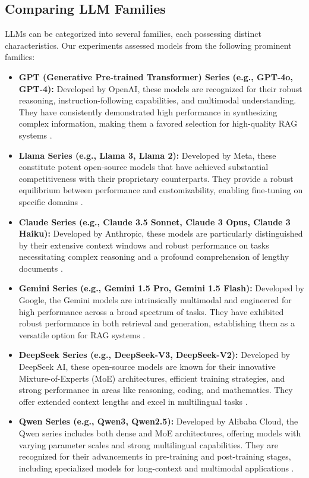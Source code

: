 \subsection{Comparing LLM Families}
LLMs can be categorized into several families, each possessing distinct characteristics. Our experiments assessed models from the following prominent families:
\begin{itemize}
    \item \textbf{GPT (Generative Pre-trained Transformer) Series (e.g., GPT-4o, GPT-4):} Developed by OpenAI, these models are recognized for their robust reasoning, instruction-following capabilities, and multimodal understanding. They have consistently demonstrated high performance in synthesizing complex information, making them a favored selection for high-quality RAG systems \autocite{openai2024gpt4technicalreport}.
    \item \textbf{Llama Series (e.g., Llama 3, Llama 2):} Developed by Meta, these constitute potent open-source models that have achieved substantial competitiveness with their proprietary counterparts. They provide a robust equilibrium between performance and customizability, enabling fine-tuning on specific domains \autocite{touvron2023llama}.
    \item \textbf{Claude Series (e.g., Claude 3.5 Sonnet, Claude 3 Opus, Claude 3 Haiku):} Developed by Anthropic, these models are particularly distinguished by their extensive context windows and robust performance on tasks necessitating complex reasoning and a profound comprehension of lengthy documents \autocite{anthropic2024claude3}.
    \item \textbf{Gemini Series (e.g., Gemini 1.5 Pro, Gemini 1.5 Flash):} Developed by Google, the Gemini models are intrinsically multimodal and engineered for high performance across a broad spectrum of tasks. They have exhibited robust performance in both retrieval and generation, establishing them as a versatile option for RAG systems \autocite{gemini2023}.
    \item \textbf{DeepSeek Series (e.g., DeepSeek-V3, DeepSeek-V2):} Developed by DeepSeek AI, these open-source models are known for their innovative Mixture-of-Experts (MoE) architectures, efficient training strategies, and strong performance in areas like reasoning, coding, and mathematics. They offer extended context lengths and excel in multilingual tasks \autocite{deepseekai2025deepseekv3technicalreport}.
    \item \textbf{Qwen Series (e.g., Qwen3, Qwen2.5):} Developed by Alibaba Cloud, the Qwen series includes both dense and MoE architectures, offering models with varying parameter scales and strong multilingual capabilities. They are recognized for their advancements in pre-training and post-training stages, including specialized models for long-context and multimodal applications \autocite{yang2025qwen3technicalreport, qwen2025qwen25technicalreport}.
\end{itemize}

